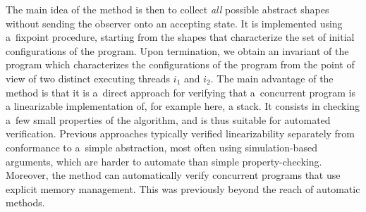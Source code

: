 The main idea of the method is then to collect \emph{all} possible
abstract shapes without sending the observer onto an accepting state.
%
%
It is implemented using %
a~fixpoint procedure, starting from the shapes that characterize the
set of initial configurations of the program.
%
Upon termination, we obtain an invariant of the program which
characterizes the configurations of the program from the point of view
of two distinct executing threads $i_1$ and $i_2$.
%
The main advantage of the method is that it is a~direct approach for
verifying that a~concurrent program is a linearizable implementation
of, for example here, a stack. It consists in checking a~few small
properties of the algorithm, and is thus suitable for automated
verification.
% 
Previous approaches typically verified linearizability separately from
conformance to a~simple abstraction, most often using simulation-based
arguments, which are harder to automate than simple property-checking.
%
Moreover, the method can automatically verify concurrent programs that
use explicit memory management. This was previously beyond the reach
of automatic methods.
%
